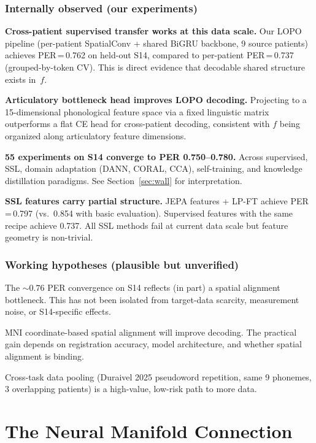 \documentclass[11pt,letterpaper]{article}
\begin{document}
\subsubsection{Internally observed (our experiments)}

\textbf{Cross-patient supervised transfer works at this data scale.} Our LOPO pipeline (per-patient SpatialConv + shared BiGRU backbone, 9 source patients) achieves PER\,=\,0.762 on held-out S14, compared to per-patient PER\,=\,0.737 (grouped-by-token CV). This is direct evidence that decodable shared structure exists in~$f$.

\textbf{Articulatory bottleneck head improves LOPO decoding.} Projecting to a 15-dimensional phonological feature space via a fixed linguistic matrix outperforms a flat CE head for cross-patient decoding, consistent with $f$ being organized along articulatory feature dimensions.

\textbf{55 experiments on S14 converge to PER 0.750--0.780.} Across supervised, SSL, domain adaptation (DANN, CORAL, CCA), self-training, and knowledge distillation paradigms. See Section~\ref{sec:wall} for interpretation.

\textbf{SSL features carry partial structure.} JEPA features + LP-FT achieve PER\,=\,0.797 (vs.\ 0.854 with basic evaluation). Supervised features with the same recipe achieve 0.737. All SSL methods fail at current data scale but feature geometry is non-trivial.

\subsubsection{Working hypotheses (plausible but unverified)}

The ${\sim}0.76$ PER convergence on S14 reflects (in part) a spatial alignment bottleneck. This has not been isolated from target-data scarcity, measurement noise, or S14-specific effects.

MNI coordinate-based spatial alignment will improve decoding. The practical gain depends on registration accuracy, model architecture, and whether spatial alignment is binding.

Cross-task data pooling (Duraivel 2025 pseudoword repetition, same 9 phonemes, 3 overlapping patients) is a high-value, low-risk path to more data.


\section{The Neural Manifold Connection}\label{sec:manifold}
\end{document}
